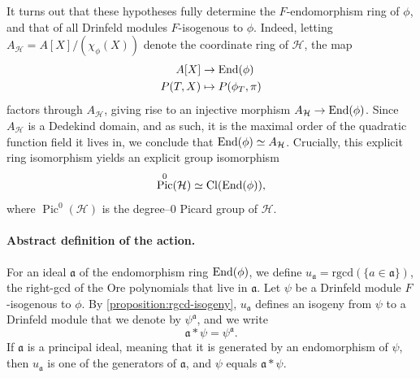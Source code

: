 \documentclass[11pt]{article}
\theoremstyle{definition}
\newcommand\End{\text{\rm End}}
\renewcommand{\H}{\mathcal H}
\DeclareMathOperator{\Pic}{Pic}
\DeclareMathOperator{\Cl}{Cl}
\begin{document}
It turns out that these hypotheses fully determine the $F$-endomorphism ring of
$\phi$, and that of all Drinfeld modules $F$-isogenous to $\phi$.
Indeed, letting $A_\H = A[X]/(\chi_\phi(X))$ denote the coordinate ring of $\H$,
the map
\begin{align*}
  A[X] &\to \End(\phi) \\
  P(T, X) &\mapsto P(\phi_T, \pi)
\end{align*}
factors through $A_\H$, giving rise to an injective morphism $A_\H \to \End(\phi)$. 
Since $A_\H$ is a Dedekind domain, and as such, it is the maximal order 
of the quadratic function field it lives in, we conclude that
$\End(\phi) \simeq A_\H$. 
Crucially, this explicit ring isomorphism yields an
explicit group isomorphism
\[
  \Pic^0(\H) \simeq \Cl(\End(\phi)),
\]
where $\Pic^0(\H)$ is the degree--$0$ Picard group of $\H$.

\paragraph{Abstract definition of the action.}

For an ideal $\mathfrak a$ of the endomorphism ring $\End(\phi)$, we
define $u_{\mathfrak a} = \mathrm{rgcd}(\{a \in \mathfrak a\})$,
the right-gcd of the Ore polynomials that live in
$\mathfrak a$. 
Let $\psi$ be a Drinfeld module $F$-isogenous to $\phi$.
By \cref{proposition:rgcd-isogeny}, $u_{\mathfrak a}$ defines an isogeny
from $\psi$ to a Drinfeld module that we denote by $\psi^{\mathfrak a}$, and we write
\[
  \mathfrak a \ast \psi = \psi^{\mathfrak a}.
\]
If $\mathfrak a$ is a principal ideal, meaning that it is generated by an
endomorphism of $\psi$, then $u_{\mathfrak a}$ is one of the generators of
$\mathfrak a$, and $\psi$ equals $\mathfrak a \ast \psi$.
\end{document}

